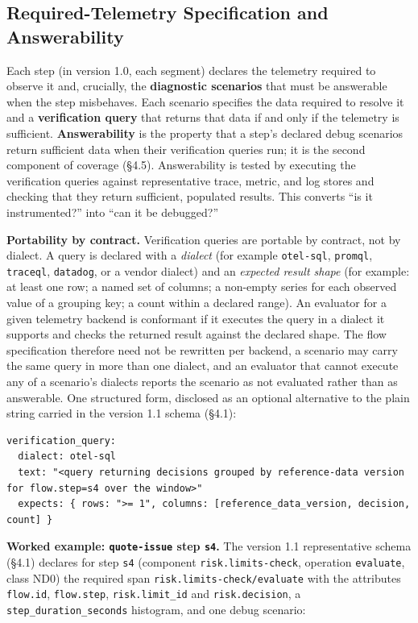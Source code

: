 \documentclass[11pt]{article}
\newcommand{\code}[1]{\texttt{#1}}
\begin{document}
\subsection{Required-Telemetry Specification and Answerability}
Each step (in version 1.0, each segment) declares the telemetry required to observe it and, crucially, the \textbf{diagnostic scenarios} that must be answerable when the step misbehaves. Each scenario specifies the data required to resolve it and a \textbf{verification query} that returns that data if and only if the telemetry is sufficient. \textbf{Answerability} is the property that a step's declared debug scenarios return sufficient data when their verification queries run; it is the second component of coverage (\S4.5). Answerability is tested by executing the verification queries against representative trace, metric, and log stores and checking that they return sufficient, populated results. This converts ``is it instrumented?'' into ``can it be debugged?''

\textbf{Portability by contract.} Verification queries are portable by contract, not by dialect. A query is declared with a \emph{dialect} (for example \code{otel-sql}, \code{promql}, \code{traceql}, \code{datadog}, or a vendor dialect) and an \emph{expected result shape} (for example: at least one row; a named set of columns; a non-empty series for each observed value of a grouping key; a count within a declared range). An evaluator for a given telemetry backend is conformant if it executes the query in a dialect it supports and checks the returned result against the declared shape. The flow specification therefore need not be rewritten per backend, a scenario may carry the same query in more than one dialect, and an evaluator that cannot execute any of a scenario's dialects reports the scenario as not evaluated rather than as answerable. One structured form, disclosed as an optional alternative to the plain string carried in the version 1.1 schema (\S4.1):

\begin{lstlisting}
verification_query:
  dialect: otel-sql
  text: "<query returning decisions grouped by reference-data version for flow.step=s4 over the window>"
  expects: { rows: ">= 1", columns: [reference_data_version, decision, count] }
\end{lstlisting}

\begin{sloppypar}
\textbf{Worked example: \code{quote-issue} step \code{s4}.} The version 1.1 representative schema (\S4.1) declares for step \code{s4} (component \code{risk.limits-check}, operation \code{evaluate}, class ND0) the required span \code{risk.limits-check/evaluate} with the attributes \code{flow.id}, \code{flow.step}, \code{risk.limit\_id} and \code{risk.decision}, a \code{step\_duration\_seconds} histogram, and one debug scenario:
\end{sloppypar}
\end{document}
